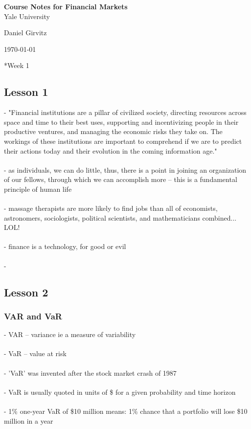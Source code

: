 \documentclass{article} %
\newcommand{\maketitletwo}[2][]{\begin{center}
        \Large{\textbf{Course Notes for Financial Markets} \\
            			   Yale University} %
        \vspace{5pt}
        
        \normalsize{Daniel Girvitz  %
        
        \today}        %
        \vspace{15pt}
        
\end{center}}
\begin{document}
     \maketitletwo[]
     
     \section*{Week 1}
     
     	\subsection*{Lesson 1}
     	- "Financial institutions are a pillar of civilized society, directing resources across space and time to their best uses, supporting and incentivizing people in their productive ventures, and managing the economic risks they take on. The workings of these institutions are important to comprehend if we are to predict their actions today and their evolution in the coming information age."
     	\\
     	\\
     	- as individuals, we can do little, thus, there is a point in joining an organization of our fellows, through which we can accomplish more -- this is a fundamental principle of human life
     	\\
     	\\
     	- massage therapists are more likely to find jobs than all of economists, astronomers, sociologists, political scientists, and mathematicians combined... LOL!
     	\\
     	\\
     	- finance is a technology, for good or evil
     	\\
     	\\
     	- 
     	
     	\subsection*{Lesson 2}
     	
     		\subsubsection*{VAR and VaR}
     	
     		- VAR -- variance ie a measure of variability \\
     		\\
     		- VaR -- value at risk \\
     		\\
     		- 'VaR' was invented after the stock market crash of 1987 \\
     		\\
     		- VaR is usually quoted in units of \$ for a given probability and time horizon \\
     		\\
     		- 1\% one-year VaR of \$10 million means: 1\% chance that a portfolio will lose \$10 million in a year \\
     		
\end{document}
